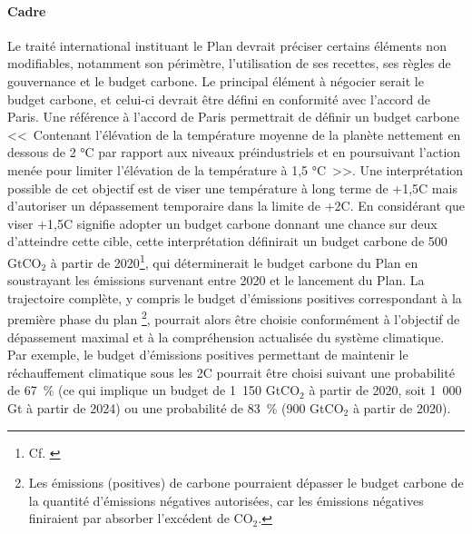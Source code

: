\documentclass[a5paper,french]{memoir}
\begin{document}
\paragraph{Cadre} %
Le traité international instituant le Plan devrait préciser certains éléments non modifiables, notamment son périmètre, l'utilisation de ses recettes, ses règles de gouvernance et le budget carbone. Le principal élément à négocier serait le budget carbone, et celui-ci devrait être défini en conformité avec l'accord de Paris. Une référence à l'accord de Paris permettrait de définir un budget carbone <<~Contenant l'élévation de la température moyenne de la planète nettement en dessous de 2 °C par rapport aux niveaux préindustriels et en poursuivant l'action menée pour limiter l'élévation de la température à 1,5 °C~>>. Une interprétation possible de cet objectif est de viser une température à long terme de +1,5\textdegree{}C mais d'autoriser un dépassement temporaire dans la limite de +2\textdegree{}C. 
En considérant que viser +1,5\textdegree{}C signifie adopter un budget carbone donnant une chance sur deux d'atteindre cette cible, cette interprétation définirait un budget carbone de 500 GtCO$_\text{2}$ à partir de 2020\footnote{Cf. \cite{ipcc_climate_2021}}, qui déterminerait le budget carbone du Plan en soustrayant les émissions survenant entre 2020 et le lancement du Plan. 
La trajectoire complète, y compris le budget d'émissions positives correspondant à la première phase du plan%
\footnote{Les émissions (positives) de carbone pourraient dépasser le budget carbone de la quantité d'émissions négatives autorisées, car les émissions négatives finiraient par absorber l'excédent de CO$_\text{2}$.}, 
pourrait alors être choisie conformément à l'objectif de dépassement maximal et à la compréhension actualisée du système climatique. 
Par exemple, le budget d'émissions positives permettant de maintenir le réchauffement climatique sous les 2\textdegree{}C pourrait être choisi suivant une probabilité de 67~\% (ce qui implique un budget de 1~150 GtCO$_\text{2}$ à partir de 2020, soit 1~000 Gt à partir de 2024) ou une probabilité de 83~\% (900 GtCO$_\text{2}$ à partir de 2020).%
\end{document}
